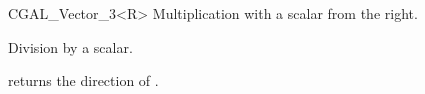 \begin {classtemplate} {CGAL_Vector_3<R>}
       {Multiplication with a scalar from the right.}



       {Division by a scalar.}

       {returns the direction of \var.}



\end {classtemplate} 

%
%
%

